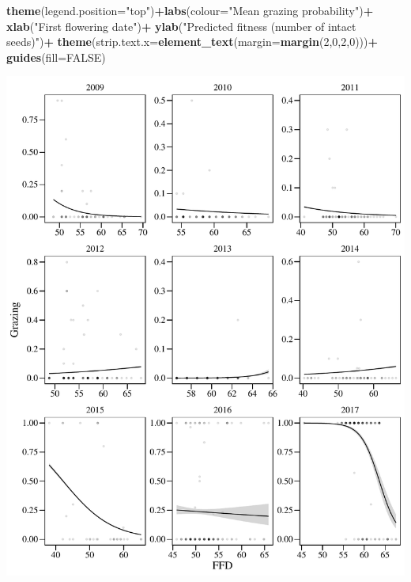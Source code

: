 \documentclass[
]{article}
\newenvironment{Shaded}{\begin{snugshade}}{\end{snugshade}}
\newcommand{\DataTypeTok}[1]{\textcolor[rgb]{0.13,0.29,0.53}{#1}}
\newcommand{\DecValTok}[1]{\textcolor[rgb]{0.00,0.00,0.81}{#1}}
\newcommand{\KeywordTok}[1]{\textcolor[rgb]{0.13,0.29,0.53}{\textbf{#1}}}
\newcommand{\NormalTok}[1]{#1}
\newcommand{\OperatorTok}[1]{\textcolor[rgb]{0.81,0.36,0.00}{\textbf{#1}}}
\newcommand{\OtherTok}[1]{\textcolor[rgb]{0.56,0.35,0.01}{#1}}
\newcommand{\StringTok}[1]{\textcolor[rgb]{0.31,0.60,0.02}{#1}}
\begin{document}
\begin{Shaded}
\begin{Highlighting}[]
\StringTok{  }\KeywordTok{theme}\NormalTok{(}\DataTypeTok{legend.position=}\StringTok{"top"}\NormalTok{)}\OperatorTok{+}\KeywordTok{labs}\NormalTok{(}\DataTypeTok{colour=}\StringTok{"Mean grazing probability"}\NormalTok{)}\OperatorTok{+}
\StringTok{  }\KeywordTok{xlab}\NormalTok{(}\StringTok{"First flowering date"}\NormalTok{)}\OperatorTok{+}
\StringTok{  }\KeywordTok{ylab}\NormalTok{(}\StringTok{"Predicted fitness (number of intact seeds)"}\NormalTok{)}\OperatorTok{+}
\StringTok{  }\KeywordTok{theme}\NormalTok{(}\DataTypeTok{strip.text.x=}\KeywordTok{element\_text}\NormalTok{(}\DataTypeTok{margin=}\KeywordTok{margin}\NormalTok{(}\DecValTok{2}\NormalTok{,}\DecValTok{0}\NormalTok{,}\DecValTok{2}\NormalTok{,}\DecValTok{0}\NormalTok{)))}\OperatorTok{+}
\StringTok{  }\KeywordTok{guides}\NormalTok{(}\DataTypeTok{fill=}\OtherTok{FALSE}\NormalTok{)}
\end{Highlighting}
\end{Shaded}

\includegraphics{lathyrus_ms3_3_after_rev_Ecology_files/figure-latex/unnamed-chunk-81-2.pdf}
\end{document}
